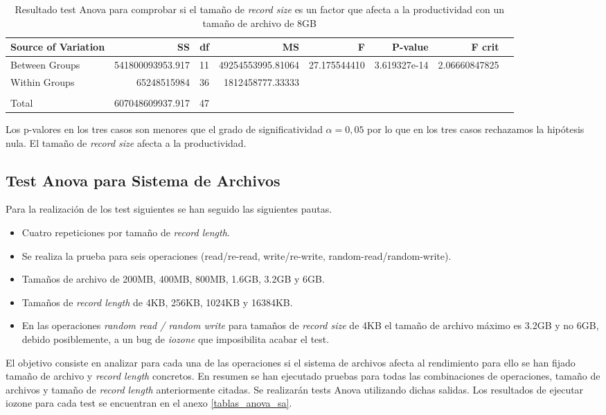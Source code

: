 \begin{table}[!htp]\centering

\scriptsize
\begin{tabular}{lrrrrrrr}\toprule
Source of Variation &SS &df &MS &F &P-value &F crit \\\midrule
Between Groups &541800093953.917 &11 &49254553995.81064 &27.175544410 &3.619327e-14 &2.06660847825 \\
Within Groups &65248515984 &36 &1812458777.33333 & & & \\
& & & & & & \\
Total &607048609937.917 &47 & & & & \\
\bottomrule
\end{tabular}
\caption{Resultado test Anova para comprobar si el tamaño de \textit{record size} es un factor que afecta a la productividad con un tamaño de archivo de 8GB}\label{tab: }
\end{table}


Los p-valores en los tres casos son menores que el grado de significatividad $\alpha = 0,05$ por lo que en los tres casos rechazamos la hipótesis nula. El tamaño de \textit{record size} afecta a la productividad.

\subsection{Test Anova para Sistema de Archivos}
Para la realización de los test siguientes se han seguido las siguientes pautas.
\begin{itemize}
    \item Cuatro repeticiones por tamaño de \textit{record length}.
    \item Se realiza la prueba para seis operaciones (read/re-read, write/re-write, random-read/random-write).
    \item Tamaños de archivo de 200MB, 400MB, 800MB, 1.6GB, 3.2GB y 6GB.
    \item Tamaños de \textit{record length} de 4KB, 256KB, 1024KB y 16384KB.
    \item En las operaciones \textit{random read / random write} para tamaños de \textit{record size} de 4KB el tamaño de archivo máximo es 3.2GB y no 6GB, debido posiblemente, a un bug de \textit{iozone} que imposibilita acabar el test.
\end{itemize}

El objetivo consiste en analizar para cada una de las operaciones si el sistema de archivos afecta al rendimiento para ello se han fijado tamaño de archivo y \textit{record length} concretos. En resumen se han ejecutado pruebas para todas las combinaciones de operaciones, tamaño de archivos y tamaño de \textit{record length} anteriormente citadas. Se realizarán tests Anova utilizando dichas salidas. Los resultados de ejecutar iozone para cada test se encuentran en el anexo \ref{tablas_anova_sa}.\\



